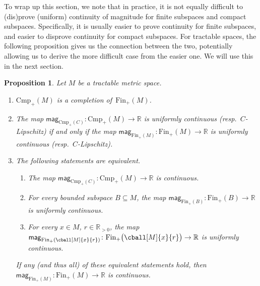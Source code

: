\documentclass[11pt]{article}
\theoremstyle{plain}
\newtheorem{proposition}[theorem]{Proposition}
\theoremstyle{definition}
\newcommand{\RR}{\mathbb{R}}
\newcommand{\mg}[1][]{\mathsf{mag}_{#1}}
\newcommand{\fsub}{\mathrm{Fin}}
\newcommand{\ifsub}{\fsub_{+}}
\newcommand{\csub}{\mathrm{Cmp}}
\newcommand{\icsub}{\csub_{+}}
\begin{document}
To wrap up this section, we note that in practice, it is not equally difficult to (dis)prove (uniform) continuity of magnitude for finite subspaces and compact subspaces. Specifically, it is usually easier to prove continuity for finite subspaces, and easier to disprove continuity for compact subspaces. For tractable spaces, the following proposition gives us the connection between the two, potentially allowing us to derive the more difficult case from the easier one. We will use this in the next section.

\begin{proposition}\label{proposition:compact-and-finite-magnitude-continuity}
Let $M$ be a tractable metric space.
\begin{enumerate}
\item
$\icsub(M)$ is a completion of~$\ifsub(M)$.
\item\label{proposition:compact-and-finite-magnitude-continuity:uniform-continuity}
 The map $\mg[\icsub(C)]\colon\icsub(M) \to \RR$ is uniformly continuous (resp.~$C$-Lipschitz) if and only if the map $\mg[\ifsub(M)]\colon\ifsub(M) \to \RR$ is uniformly continuous (resp.~$C$-Lipschitz).
\item\label{proposition:compact-and-finite-magnitude-continuity:compact-continuity}
The following statements are equivalent.
\begin{enumerate}%
\item\label{proposition:compact-and-finite-magnitude-continuity:compact-continuity:magnitude-continuous}
The map $\mg[\icsub(C)]\colon\icsub(M) \to \RR$ is continuous.
\item\label{proposition:compact-and-finite-magnitude-continuity:compact-continuity:bounded-uniformly-continuous}
For every bounded subspace $B \subseteq M$, the map $\mg[\ifsub(B)]\colon\ifsub(B) \to \RR$ is uniformly continuous.
\item\label{proposition:compact-and-finite-magnitude-continuity:compact-continuity:ball-uniformly-continuous}
For every $x \in M$, $r \in \RR_{> 0}$, the map $\mg[\ifsub({\cball[M]{x}{r}})]\colon\ifsub\big(\cball[M]{x}{r}\big) \to \RR$ is uniformly continuous.
\end{enumerate}
If any (and thus all) of these equivalent statements hold, then $\mg[\ifsub(M)]\colon\ifsub(M) \to \RR$ is continuous.
\end{enumerate}
\end{proposition}
\end{document}
